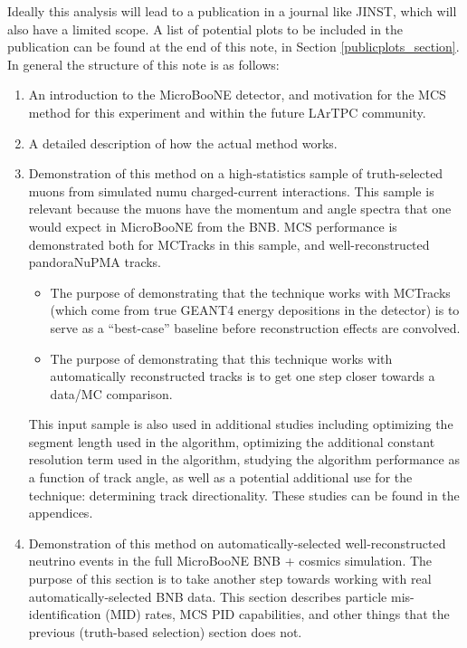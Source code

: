 \documentclass{article}
\begin{document}
Ideally this analysis will lead to a publication in a journal like JINST, which will also have a limited scope. A list of potential plots to be included in the publication can be found at the end of this note, in Section \ref{publicplots_section}.\\

In general the structure of this note is as follows:
\begin{enumerate}
\item An introduction to the MicroBooNE detector, and motivation for the MCS method for this experiment and within the future LArTPC community.
\item A detailed description of how the actual method works.
\item Demonstration of this method on a high-statistics sample of truth-selected muons from simulated numu charged-current interactions. This sample is relevant because the muons have the momentum and angle spectra that one would expect in MicroBooNE from the BNB. MCS performance is demonstrated both for {\sc MCTracks} in this sample, and well-reconstructed pandoraNuPMA tracks. 
\begin{itemize}
	\item The purpose of demonstrating that the technique works with {\sc MCTracks} (which come from true {\sc GEANT4} energy depositions in the detector) is to serve as a ``best-case'' baseline before reconstruction effects are convolved. 
	\item The purpose of demonstrating that this technique works with automatically reconstructed tracks is to get one step closer towards a data/MC comparison.
\end{itemize}
This input sample is also used in additional studies including optimizing the segment length used in the algorithm, optimizing the additional constant resolution term used in the algorithm, studying the algorithm performance as a function of track angle, as well as a potential additional use for the technique: determining track directionality. These studies can be found in the appendices.
\item Demonstration of this method on automatically-selected well-reconstructed neutrino events in the full MicroBooNE BNB + cosmics simulation. The purpose of this section is to take another step towards working with real automatically-selected BNB data. This section describes particle mis-identification (MID) rates, MCS PID capabilities, and other things that the previous (truth-based selection) section does not.

\end{enumerate}
\end{document}
